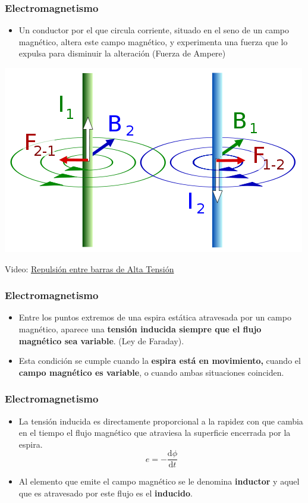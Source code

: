 \documentclass[serif, xcolor=dvipsnames]{beamer}
\begin{document}
\begin{frame}
  \frametitle{Electromagnetismo}
  \begin{itemize}
  \item Un conductor por el que circula corriente, situado en el seno
    de un campo magnético, altera este campo magnético, y experimenta
    una fuerza que lo expulsa para disminuir la alteración (Fuerza de
    Ampere)
  \end{itemize}
  \begin{center}
    \includegraphics[scale=0.3]{../figs/FuerzasRepulsion}
    \par\end{center}
  \begin{block} {}
    \centering Video:
    \href{http://www.youtube.com/watch?v=2j8D_N1v0tU}{Repulsión entre
      barras de Alta Tensión}
  \end{block}

\end{frame}
\begin{frame}
  \frametitle{Electromagnetismo}
  \begin{itemize}
  \item Entre los puntos extremos de una espira estática atravesada
    por un campo magnético, aparece una \textbf{tensión inducida
      siempre que el flujo magnético sea variable}. (Ley de Faraday).
  \item Esta condición se cumple cuando la \textbf{espira está en
      movimiento,} cuando el \textbf{campo magnético es variable}, o
    cuando ambas situaciones coinciden.
  \end{itemize}

\end{frame}
\begin{frame}
  \frametitle{Electromagnetismo}
  \begin{itemize}
  \item La tensión inducida es directamente proporcional a la rapidez
    con que cambia en el tiempo el flujo magnético que atraviesa la
    superficie encerrada por la espira.
    \[
    e=-\frac{\mathrm{d}\phi}{\mathrm{d}t}
    \]

  \item Al elemento que emite el campo magnético se le
    denomina\textbf{ inductor} y aquel que es atravesado por este
    flujo es el \textbf{inducido}.
  \end{itemize}

\end{frame}
\end{document}
